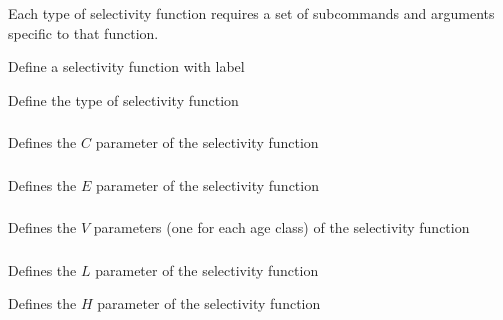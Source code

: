 Each type of selectivity function requires a set of subcommands and arguments specific to that function.

 {Define a selectivity function with label}

 {Define the type of selectivity function}

\subsubsection[Constant]{}

 {Defines the $C$ parameter of the selectivity function}

\subsubsection[Knife-edge]{}

 {Defines the $E$ parameter of the selectivity function}

\subsubsection[All-values]{}

 {Defines the $V$ parameters (one for each age class) of the selectivity function}

\subsubsection[All-values-bounded]{}

 {Defines the $L$ parameter of the selectivity function}

 {Defines the $H$ parameter of the selectivity function}

